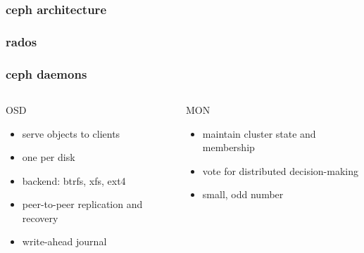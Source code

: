 \documentclass[10pt, compress]{beamer}
\begin{document}
\begin{frame}[fragile]
    \frametitle{ceph architecture}
    \begin{center}
    \end{center}
\end{frame}

\begin{frame}[fragile]
    \frametitle{rados}
    \begin{center}
        
    \end{center}
\end{frame}

\begin{frame}[fragile]
    \frametitle{ceph daemons}
    \begin{columns}
            \begin{block}{OSD}
                \begin{itemize}
                \item serve objects to clients
                \item one per disk
                \item backend: btrfs, xfs, ext4
                \item peer-to-peer replication and recovery
                \item write-ahead journal
            \end{itemize}
            \end{block}
            \begin{block}{MON}
                \begin{itemize}
                \item maintain cluster state and membership
                \item vote for distributed decision-making
                \item small, odd number
                \end{itemize}
                \vspace*{8mm}
            \end{block}
    \end{columns}
\end{frame}
\end{document}
